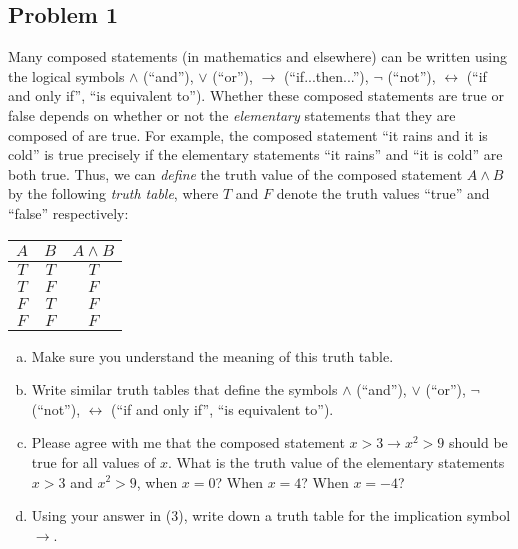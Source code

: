 \documentclass{amsart}
\theoremstyle{definition} \newtheorem*{definition}{Definition}
\theoremstyle{remark} \newtheorem*{ex}{Example}
\begin{document}
\subsection*{Problem 1}
Many composed statements (in mathematics and elsewhere) can be written using the logical symbols $\wedge$ (``and''), $\vee$ (``or''), $\to$ (``if...then...''), $\neg$ (``not''), $\leftrightarrow$ (``if and only if'', ``is equivalent to''). Whether these composed statements are true or false depends on whether or not the {\em elementary} statements that they are composed of are true.  For example, the composed statement ``it rains and it is cold'' is true precisely if the elementary statements ``it rains'' and ``it is cold'' are both true. Thus, we can {\em define} the truth value of the composed statement $A\wedge B$ by the following {\em truth table}, where $T$ and $F$ denote the truth values ``true'' and ``false'' respectively: \begin{center}
\begin{tabular}{ |c c|c |} 
 \hline
 $A$&$B$&$A\wedge B$ \\
 \hline 
$T$&$T$& $T$\\
$T$&$F$& $F$\\
$F$&$T$& $F$\\
$F$&$F$& $F$\\
 \hline
\end{tabular}
\end{center}
\begin{enumerate}[a)]
\item Make sure you understand the meaning of this truth table.
\item Write similar truth tables that define the symbols $\wedge$ (``and''), $\vee$ (``or''), $\neg$ (``not''), $\leftrightarrow$ (``if and only if'', ``is equivalent to'').
\item Please agree with me that the composed statement $x>3\to x^2>9$ should be true for all values of $x$. What is the truth value of the elementary statements $x>3$ and $x^2>9$, when $x=0$? When $x=4$? When $x=-4$?
\item Using your answer in (3), write down a truth table for the implication symbol $\to$.
\end{enumerate}
\end{document}
